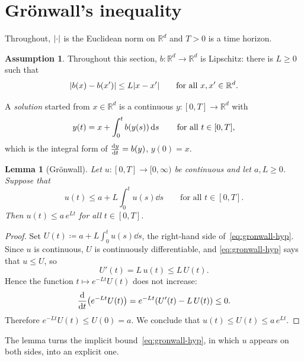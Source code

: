 \documentclass{amsart}
\newtheorem{lemma}[theorem]{Lemma}
\theoremstyle{definition}
\newtheorem{assumption}[theorem]{Assumption}
\theoremstyle{remark}
\numberwithin{equation}{section}
\newcommand{\R}{\mathbb{R}}
\begin{document}
\section{Gr\"onwall's inequality}\label{sec:gronwall}

Throughout, $\abs{\cdot}$ is the Euclidean norm on $\R^d$ and $T > 0$ is a
time horizon.

\begin{assumption}\label{ass:lip}
Throughout this section, $b \colon \R^d \to \R^d$ is Lipschitz: there is
$L \ge 0$ such that
\begin{equation}\label{eq:lip}
  \abs{b(x) - b(x')} \le L \abs{x - x'} \qquad \text{for all } x, x' \in \R^d .
\end{equation}
\end{assumption}

A \emph{solution} started from $x \in \R^d$ is a continuous
$y \colon [0, T] \to \R^d$ with
\begin{equation}\label{eq:integral}
  y(t) = x + \int_0^t b\qty(y(s)) \dd{s} \qquad \text{for all } t \in [0, T],
\end{equation}
which is the integral form of $\dv{y}{t} = b(y)$, $y(0) = x$.

\begin{lemma}[Gr\"onwall]\label{lem:gronwall}
Let $u \colon [0, T] \to [0, \infty)$ be continuous and let $a, L \ge 0$.
Suppose that
\begin{equation}\label{eq:gronwall-hyp}
  u(t) \le a + L \int_0^t u(s) \dd{s} \qquad \text{for all } t \in [0, T].
\end{equation}
Then $u(t) \le a\, e^{Lt}$ for all $t \in [0, T]$.
\end{lemma}

\begin{proof}
Set $U(t) \coloneqq a + L \int_0^t u(s) \dd{s}$, the right-hand side
of~\eqref{eq:gronwall-hyp}. Since $u$ is continuous, $U$ is continuously
differentiable, and \eqref{eq:gronwall-hyp} says that $u \le U$, so
\[
  U'(t) = L\, u(t) \le L\, U(t).
\]
Hence the function $t \mapsto e^{-Lt} U(t)$ does not increase:
\[
  \dv{t} \qty(e^{-Lt} U(t)) = e^{-Lt} \qty(U'(t) - L\, U(t)) \le 0 .
\]
Therefore $e^{-Lt} U(t) \le U(0) = a$. We conclude that
$u(t) \le U(t) \le a\, e^{Lt}$.
\end{proof}

%
The lemma turns the implicit bound~\eqref{eq:gronwall-hyp}, in which $u$
appears on both sides, into an explicit one.
\end{document}
